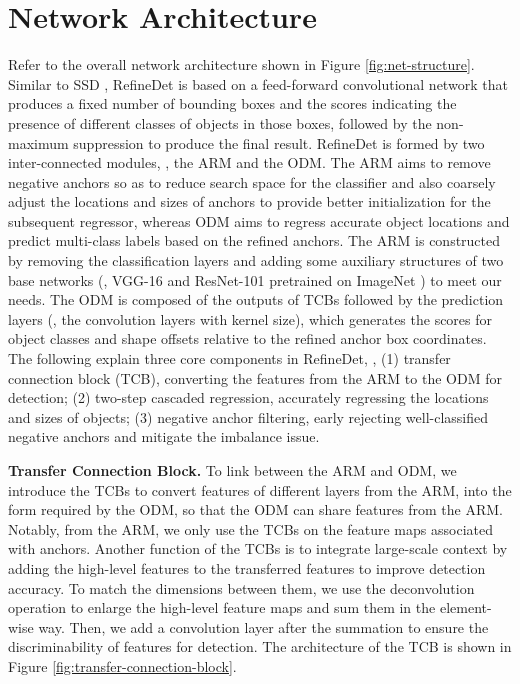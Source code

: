 \documentclass[10pt,twocolumn,letterpaper]{article}
\begin{document}
\section{Network Architecture}
Refer to the overall network architecture shown in Figure \ref{fig:net-structure}. Similar to SSD \cite{DBLP:conf/eccv/LiuAESRFB16}, RefineDet is based on a feed-forward convolutional network that produces a fixed number of bounding boxes and the scores indicating the presence of different classes of objects in those boxes, followed by the non-maximum suppression to produce the final result. RefineDet is formed by two inter-connected modules, \ie, the ARM and the ODM. The ARM aims to remove negative anchors so as to reduce search space for the classifier and also coarsely adjust the locations and sizes of anchors to provide better initialization for the subsequent regressor, whereas ODM aims to regress accurate object locations and predict multi-class labels based on the refined anchors. The ARM is constructed by removing the classification layers and adding some auxiliary structures of two base networks (\ie, VGG-16 \cite{DBLP:journals/corr/SimonyanZ14a} and ResNet-101 \cite{DBLP:conf/cvpr/HeZRS16} pretrained on ImageNet \cite{DBLP:journals/ijcv/RussakovskyDSKS15}) to meet our needs. The ODM is composed of the outputs of TCBs followed by the prediction layers (\ie, the convolution layers with  kernel size), which generates the scores for object classes and shape offsets relative to the refined anchor box coordinates. The following explain three core components in RefineDet, \ie, (1) transfer connection block (TCB), converting the features from the ARM to the ODM for detection; (2) two-step cascaded regression, accurately regressing the locations and sizes of objects; (3) negative anchor filtering, early rejecting well-classified negative anchors and mitigate the imbalance issue.





{\noindent \textbf{Transfer Connection Block.}}
To link between the ARM and ODM, we introduce  the TCBs to convert features of different layers from the ARM, into the form required by the ODM, so that the ODM can share features from the ARM. Notably, from the ARM, we only use the TCBs on the feature maps associated with anchors. Another function of the TCBs is to integrate large-scale context \cite{DBLP:journals/corr/FuLRTB17,DBLP:conf/cvpr/LinDGHHB17} by adding the high-level features to the transferred features to improve detection accuracy. To match the dimensions between them, we use the deconvolution operation to enlarge the high-level feature maps and sum them in the element-wise way. Then, we add a convolution layer after the summation to ensure the discriminability of features for detection. The architecture of the TCB is shown in Figure \ref{fig:transfer-connection-block}.
\end{document}
